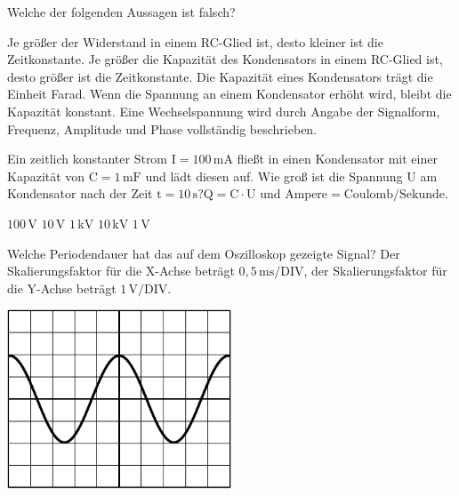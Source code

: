 \documentclass[11pt]{exam}
\begin{document}
\setlength{\voffset}{-0.5in}
\setlength{\headsep}{5pt}

\hspace{2mm}
 \hspace{5mm}
\vspace{4mm}

\begin{questions}

\question Welche der folgenden Aussagen ist falsch?

\begin{choices}
	\choice Je größer der Widerstand in einem RC-Glied ist, desto kleiner ist die Zeitkonstante.
	\choice Je größer die Kapazität des Kondensators in einem RC-Glied ist, desto größer ist die Zeitkonstante.
	\choice Die Kapazität eines Kondensators trägt die Einheit Farad.
	\choice Wenn die Spannung an einem Kondensator erhöht wird, bleibt die Kapazität konstant.
	\choice Eine Wechselspannung wird durch Angabe der Signalform, Frequenz, Amplitude und Phase vollständig beschrieben.
\end{choices}

\vspace{3mm}\question Ein zeitlich konstanter Strom \(\mathrm{I=100\,mA}\) fließt in einen Kondensator mit einer Kapazität von \(\mathrm{C=1\,mF}\) und lädt diesen auf. Wie groß ist die Spannung \(\mathrm{U}\) am Kondensator nach der Zeit \(\mathrm{t=10\,s}\)?\(\mathrm{Q=C \cdot U}\) und \(\mathrm{Ampere=Coulomb/Sekunde}\).

\begin{choices}
	\choice \(\mathrm{100\,V}\)
	\choice \(\mathrm{10\,V}\)
	\choice \(\mathrm{1\,kV}\)
	\choice \(\mathrm{10\,kV}\)
	\choice \(\mathrm{1\,V}\)
\end{choices}

\vspace{3mm}\question Welche Periodendauer hat das auf dem Oszilloskop gezeigte Signal? Der Skalierungsfaktor für die X-Achse beträgt \(\mathrm{0,5\,ms/DIV}\), der Skalierungsfaktor für die Y-Achse beträgt \(\mathrm{1\,V/DIV}\). 

\includegraphics[width=0.5\textwidth]{../../../questions/D/images/Oszi2.png}


\end{questions}
\end{document}
